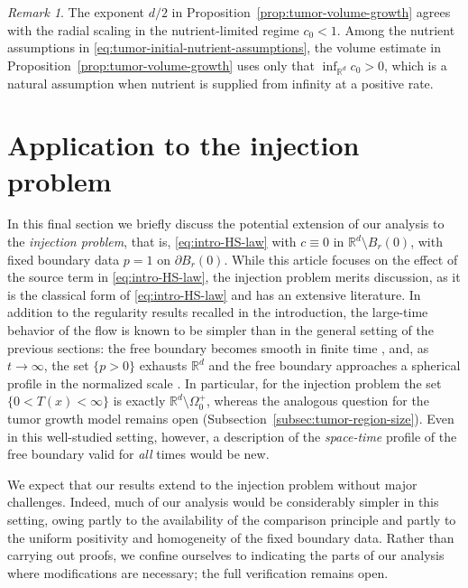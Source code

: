 \documentclass[11pt]{amsart}
\numberwithin{equation}{section}
\numberwithin{figure}{section}
\theoremstyle{plain}
\theoremstyle{definition}
\theoremstyle{remark}
\newtheorem{rem}[thm]{Remark}
\theoremstyle{plain}
\def\R{\mathbb{R}}
\begin{document}
\begin{rem}
The exponent
$d/2$ in Proposition~\ref{prop:tumor-volume-growth} agrees with the radial
scaling in the nutrient-limited regime $c_0<1$. Among the nutrient assumptions in
\eqref{eq:tumor-initial-nutrient-assumptions}, the volume estimate in
Proposition~\ref{prop:tumor-volume-growth} uses only that 
$\inf_{\R^d}c_0>0$, which is a natural assumption when nutrient is supplied from infinity at
a positive rate.    
\end{rem}







\section{Application to the injection problem}\label{sec:injection}

In this final section we briefly discuss the potential extension of our analysis to the {\it injection problem}, that is, \eqref{eq:intro-HS-law} with $c\equiv 0$ in $\R^d\setminus B_r(0)$, with fixed boundary data $p=1$ on $\partial B_r(0)$. While this article focuses on the effect of the source term in \eqref{eq:intro-HS-law}, the injection problem merits discussion, as it is the classical form of \eqref{eq:intro-HS-law} and has an extensive literature. In addition to the regularity results recalled in the introduction, the large-time behavior of the flow is known to be simpler than in the general setting of the previous sections: the free boundary becomes smooth in finite time \cite{Kim06,kim06long}, and, as $t\to\infty$, the set $\{p>0\}$ exhausts $\R^d$ and the free boundary approaches a spherical profile in the normalized scale \cite{qv01}. In particular, for the injection problem the set $\{0<T(x)<\infty\}$ is exactly $\R^d \setminus \Omega_0^{+}$, whereas the analogous question for the tumor growth model remains open (Subsection~\ref{subsec:tumor-region-size}). Even in this well-studied setting, however, a description of the {\it space-time} profile of the free boundary valid for {\it all} times would be new.


We expect that our results extend to the injection problem without major challenges. Indeed, much of our analysis would be considerably simpler in this setting, owing partly to the availability of the comparison principle and partly to the uniform positivity and homogeneity of the fixed boundary data. Rather than carrying out proofs, we confine ourselves to indicating the parts of our analysis where modifications are necessary; the full verification remains open.
\end{document}
